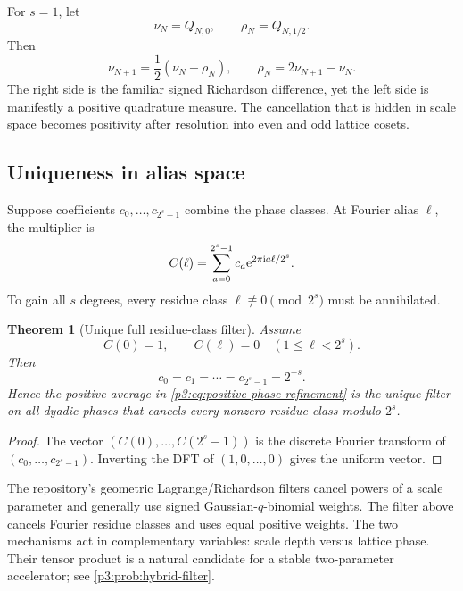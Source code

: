 \documentclass[11pt,oneside]{article}
\numberwithin{equation}{section}
\newtheorem{theorem}{Theorem}[section]
\theoremstyle{definition}
\theoremstyle{remark}
\newcommand{\e}{\mathrm e}
\begin{document}
For $s=1$, let
\[
 \nu_N=Q_{N,0},
 \qquad
 \rho_N=Q_{N,1/2}.
\]
Then
\begin{equation}
 \nu_{N+1}=\frac12(\nu_N+\rho_N),
 \qquad
 \boxed{\rho_N=2\nu_{N+1}-\nu_N.}
 \label{p3:eq:midpoint-Richardson}
\end{equation}
The right side is the familiar signed Richardson difference, yet the left side is manifestly a positive quadrature measure.  The cancellation that is hidden in scale space becomes positivity after resolution into even and odd lattice cosets.

\subsection{Uniqueness in alias space}

Suppose coefficients $c_0,\ldots,c_{2^s-1}$ combine the phase classes.  At Fourier alias $\ell$, the multiplier is
\begin{equation}
 C(\ell)=\sum_{a=0}^{2^s-1}c_a\e^{2\pi\iu a\ell/2^s}.
 \label{p3:eq:DFT-filter}
\end{equation}
To gain all $s$ degrees, every residue class $\ell\not\equiv0\pmod{2^s}$ must be annihilated.

\begin{theorem}[Unique full residue-class filter]
\label{p3:thm:unique-phase-filter}
Assume
\begin{equation}
 C(0)=1,
 \qquad
 C(\ell)=0\quad(1\le\ell<2^s).
 \label{p3:eq:DFT-conditions}
\end{equation}
Then
\begin{equation}
 c_0=c_1=\cdots=c_{2^s-1}=2^{-s}.
 \label{p3:eq:unique-uniform-filter}
\end{equation}
Hence the positive average in \eqref{p3:eq:positive-phase-refinement} is the unique filter on all dyadic phases that cancels every nonzero residue class modulo $2^s$.
\end{theorem}

\begin{proof}
The vector $(C(0),\ldots,C(2^s-1))$ is the discrete Fourier transform of $(c_0,\ldots,c_{2^s-1})$.  Inverting the DFT of $(1,0,\ldots,0)$ gives the uniform vector.
\end{proof}

\begin{remark}
The repository's geometric Lagrange/Richardson filters cancel powers of a scale parameter and generally use signed Gaussian-$q$-binomial weights.  The filter above cancels Fourier residue classes and uses equal positive weights.  The two mechanisms act in complementary variables: scale depth versus lattice phase.  Their tensor product is a natural candidate for a stable two-parameter accelerator; see \cref{p3:prob:hybrid-filter}.
\end{remark}
\end{document}
